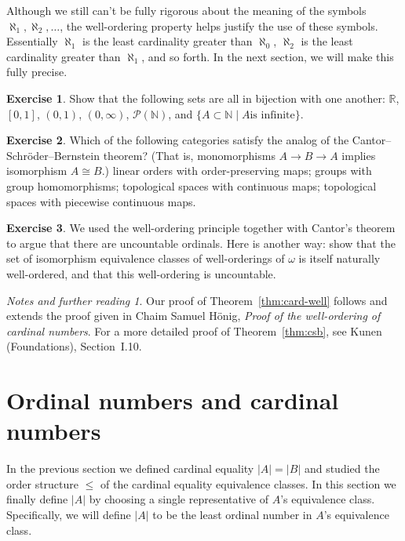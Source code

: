 \documentclass[11pt,oneside]{amsbook}
\newcommand{\N}{\mathbb N}
\newcommand{\R}{\mathbb R}
\theoremstyle{definition}
\newtheorem{exerc}{Exercise}[section]
\theoremstyle{plain}
\theoremstyle{definition}
\theoremstyle{remark}
\newtheorem*{notes}{Notes and further reading}
\numberwithin{equation}{section}
\numberwithin{figure}{section}
\begin{document}
Although we still can't be fully rigorous about the meaning of the symbols $\aleph_1,\aleph_2,\ldots$, the well-ordering property helps justify the use of these symbols. Essentially $\aleph_1$ is the least cardinality greater than $\aleph_0$, $\aleph_2$ is the least cardinality greater than $\aleph_1$, and so forth. In the next section, we will make this fully precise.

\begin{exerc}
  Show that the following sets are all in bijection with one another: $\R$, $[0,1]$, $(0,1)$, $(0,\infty)$, $\mathcal P(\N)$, and $\{A\subset\N\mid A\text{is infinite}\}$.
\end{exerc}

\begin{exerc}
  Which of the following categories satisfy the analog of the Cantor--Schr\"oder--Bernstein theorem? (That is, monomorphisms $A\to B\to A$ implies isomorphism $A\cong B$.) linear orders with order-preserving maps; groups with group homomorphisms; topological spaces with continuous maps; topological spaces with piecewise continuous maps.
\end{exerc}

\begin{exerc}
  We used the well-ordering principle together with Cantor's theorem to argue that there are uncountable ordinals. Here is another way: show that the set of isomorphism equivalence classes of well-orderings of $\omega$ is itself naturally well-ordered, and that this well-ordering is uncountable.
\end{exerc}

\begin{notes}
  Our proof of Theorem~\ref{thm:card-well} follows and extends the proof given in Chaim Samuel H\"onig, \emph{Proof of the well-ordering of cardinal numbers}. For a more detailed proof of Theorem~\ref{thm:csb}, see Kunen (Foundations), Section~I.10.
\end{notes}


\newpage
\section{Ordinal numbers and cardinal numbers}

In the previous section we defined cardinal equality $|A|=|B|$ and studied the order structure $\leq$ of the cardinal equality equivalence classes. In this section we finally define $|A|$ by choosing a single representative of $A$'s equivalence class. Specifically, we will define $|A|$ to be the least ordinal number in $A$'s equivalence class.
\end{document}

